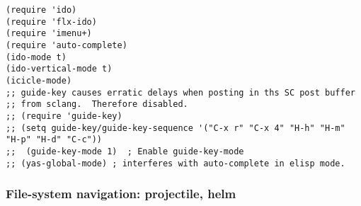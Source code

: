 \documentclass[nofonts]{tufte-handout}
\begin{document}
\begin{verbatim}
(require 'ido)
(require 'flx-ido)
(require 'imenu+)
(require 'auto-complete)
(ido-mode t)
(ido-vertical-mode t)
(icicle-mode)
;; guide-key causes erratic delays when posting in ths SC post buffer
;; from sclang.  Therefore disabled.
;; (require 'guide-key)
;; (setq guide-key/guide-key-sequence '("C-x r" "C-x 4" "H-h" "H-m" "H-p" "H-d" "C-c"))
;;  (guide-key-mode 1)  ; Enable guide-key-mode
;; (yas-global-mode) ; interferes with auto-complete in elisp mode.
\end{verbatim}

\subsubsection{File-system navigation: projectile, helm}
\label{sec-1-11-9}
\end{document}
